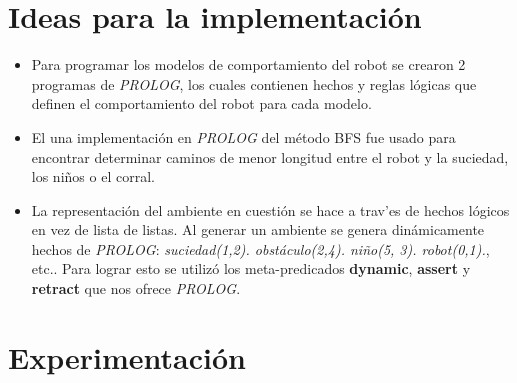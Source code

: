 \documentclass[12pt]{article}
\begin{document}
\section{Ideas para la implementaci\'on}
	\begin{itemize}
		\item Para programar los modelos de comportamiento del robot se crearon
		2 programas de \textit{PROLOG}, los cuales contienen hechos y reglas l\'ogicas que
		definen el comportamiento del robot para cada modelo.
		\item El una implementaci\'on en \textit{PROLOG} del m\'etodo BFS fue usado para 
		encontrar determinar caminos de menor longitud entre el robot y la suciedad,
		los ni\~nos o el corral.
		\item La representaci\'on del ambiente en cuesti\'on se hace a trav'es de
		hechos l\'ogicos en vez de lista de listas. Al generar un ambiente se
		genera din\'amicamente hechos de \textit{PROLOG}: \textit{suciedad(1,2). 
		obst\'aculo(2,4). ni\~no(5, 3). robot(0,1).}, etc.. Para lograr esto se
		utiliz\'o los meta-predicados  \textbf{dynamic}, \textbf{assert} y \textbf{retract}
		que nos ofrece \textit{PROLOG}.
	\end{itemize}
\section{Experimentaci\'on}
\end{document}
